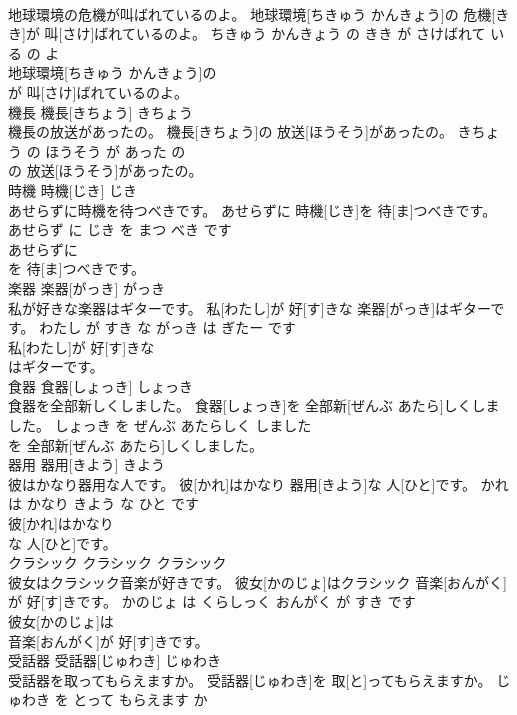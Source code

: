 \documentclass[8pt]{extreport}
\begin{document}
\begin{CJK}{UTF8}{min}
\\	地球環境の危機が叫ばれているのよ。	地球環境[ちきゅう かんきょう]の 危機[きき]が 叫[さけ]ばれているのよ。	ちきゅう かんきょう の きき が さけばれて いる の よ	
\\	地球環境[ちきゅう かんきょう]の
\\	が 叫[さけ]ばれているのよ。			
\\	機長	機長[きちょう]	きちょう	
\\	機長の放送があったの。	機長[きちょう]の 放送[ほうそう]があったの。	きちょう の ほうそう が あった の	
\\	の 放送[ほうそう]があったの。			
\\	時機	時機[じき]	じき	
\\	あせらずに時機を待つべきです。	あせらずに 時機[じき]を 待[ま]つべきです。	あせらず に じき を まつ べき です	
\\	あせらずに
\\	を 待[ま]つべきです。			
\\	楽器	楽器[がっき]	がっき	
\\	私が好きな楽器はギターです。	私[わたし]が 好[す]きな 楽器[がっき]はギターです。	わたし が すき な がっき は ぎたー です	
\\	私[わたし]が 好[す]きな
\\	はギターです。			
\\	食器	食器[しょっき]	しょっき	
\\	食器を全部新しくしました。	食器[しょっき]を 全部新[ぜんぶ あたら]しくしました。	しょっき を ぜんぶ あたらしく しました	
\\	を 全部新[ぜんぶ あたら]しくしました。			
\\	器用	器用[きよう]	きよう	
\\	彼はかなり器用な人です。	彼[かれ]はかなり 器用[きよう]な 人[ひと]です。	かれ は かなり きよう な ひと です	
\\	彼[かれ]はかなり
\\	な 人[ひと]です。			
\\	クラシック	クラシック	クラシック	
\\	彼女はクラシック音楽が好きです。	彼女[かのじょ]はクラシック 音楽[おんがく]が 好[す]きです。	かのじょ は くらしっく おんがく が すき です	
\\	彼女[かのじょ]は
\\	音楽[おんがく]が 好[す]きです。			
\\	受話器	受話器[じゅわき]	じゅわき	
\\	受話器を取ってもらえますか。	受話器[じゅわき]を 取[と]ってもらえますか。	じゅわき を とって もらえます か	

\end{CJK}
\end{document}
